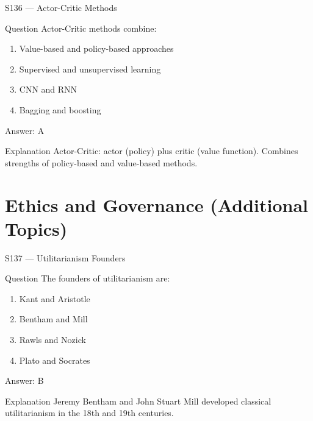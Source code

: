 \documentclass[aspectratio=169,8pt]{beamer}
\begin{document}
	\begin{frame}{S136 --- Actor-Critic Methods}
		\begin{block}{Question}
			Actor-Critic methods combine:
			\begin{enumerate}
				\item Value-based and policy-based approaches
				\item Supervised and unsupervised learning
				\item CNN and RNN
				\item Bagging and boosting
			\end{enumerate}
		\end{block}
		\begin{exampleblock}{Answer: A}\end{exampleblock}
		\begin{block}{Explanation}
			Actor-Critic: actor (policy) plus critic (value function). Combines strengths of policy-based and value-based methods.
		\end{block}
	\end{frame}
	
	\section{Ethics and Governance (Additional Topics)}
	
	\begin{frame}{S137 --- Utilitarianism Founders}
		\begin{block}{Question}
			The founders of utilitarianism are:
			\begin{enumerate}
				\item Kant and Aristotle
				\item Bentham and Mill
				\item Rawls and Nozick
				\item Plato and Socrates
			\end{enumerate}
		\end{block}
		\begin{exampleblock}{Answer: B}\end{exampleblock}
		\begin{block}{Explanation}
			Jeremy Bentham and John Stuart Mill developed classical utilitarianism in the 18th and 19th centuries.
		\end{block}
	\end{frame}
	
\end{document}
